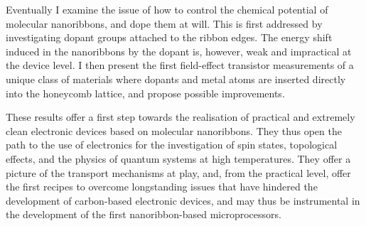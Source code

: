Eventually I examine the issue of how to control the chemical potential of molecular nanoribbons, and dope them at will. This is first addressed by investigating dopant groups attached to the ribbon edges. The energy shift induced in the nanoribbons by the dopant is, however, weak and impractical at the device level. I then present the first field-effect transistor measurements of a unique class of materials where dopants and metal atoms are inserted directly into the honeycomb lattice, and propose possible improvements.

These results offer a first step towards the realisation of practical and extremely clean electronic devices based on molecular nanoribbons. They thus open the path to the use of electronics for the investigation of spin states, topological effects, and the physics of quantum systems at high temperatures. They offer a picture of the transport mechanisms at play, and, from the practical level, offer the first recipes to overcome longstanding issues that have hindered the development of carbon-based electronic devices, and may thus be instrumental in the development of the first nanoribbon-based microprocessors.
